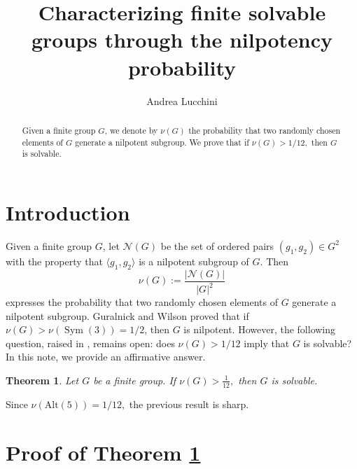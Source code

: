 \documentclass{amsart}
\DeclareMathOperator{\perm}{Sym}
\newcommand{\alt}{\mathrm{Alt}}
\newtheorem{thm}{Theorem}
\numberwithin{equation}{section}
\begin{document}
	
\title[The nilpotency probability]{Characterizing finite solvable groups through the nilpotency probability}


\author{Andrea Lucchini}
\address{Andrea Lucchini\\ Universit\`a di Padova\\  Dipartimento di Matematica \lq\lq Tullio Levi-Civita\rq\rq\\ Via Trieste 63, 35121 Padova, Italy\\email: lucchini@math.unipd.it}

\begin{abstract}
Given a finite group $G$, we denote by $\nu(G)$ the probability that two randomly chosen elements of $G$ generate a nilpotent subgroup. We prove that if $\nu(G)>1/12,$ then $G$ is solvable.
\end{abstract}

\maketitle



\section{Introduction}

Given a finite group $G$, let $\mathcal N(G)$ be the set of ordered pairs $(g_1,g_2)\in G^2$ with the property that
$\langle g_1, g_2\rangle$ is a nilpotent subgroup of $G$. Then
$$\nu(G):=\frac{|\mathcal N(G)|}{|G|^2}$$
expresses the probability that two randomly chosen elements of $G$ generate a nilpotent subgroup.
Guralnick and Wilson \cite{gw} proved that if $\nu(G) > \nu(\perm(3)) = 1/2$, then $G$ is nilpotent. However, the following question, raised in \cite{cgk}, remains open: does $\nu(G) > 1/12$ imply that $G$ is solvable? In this note, we provide an affirmative answer.




\begin{thm}\label{main}
	Let $G$ be a finite group. If $\nu(G)>\frac{1}{12},$ then
	$G$ is solvable.
\end{thm}
Since $\nu(\alt(5))=1/12,$ the previous result is sharp.

\section{Proof of Theorem \ref{main}}
\end{document}
